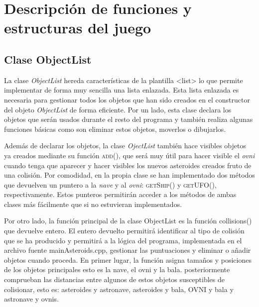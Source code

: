 \section{Descripción de funciones y estructuras del juego}
\subsection{Clase ObjectList}

La clase \emph{ObjectList} hereda características de la plantilla {\textless list\textgreater} lo que permite implementar de forma muy sencilla una lista enlazada. Esta lista enlazada es necesaria para gestionar todos los objetos que han sido creados en el constructor del objeto \emph{ObjectList} de forma eficiente. 
Por un lado, esta clase declara los objetos que serán usados durante el resto del programa y también realiza algunas funciones básicas como son eliminar estos objetos, moverlos o dibujarlos.

Además de declarar los objetos, la clase \emph{OjectList} también hace visibles objetos ya creados mediante su función \textsc{add()}, que será muy útil para hacer visible el \emph{ovni} cuando tenga que aparecer y hacer visibles los nuevos asteroides creados fruto de una colisión. 
Por comodidad, en la propia clase se han implementado dos métodos que devuelven un puntero a la \emph{nave} y al \emph{ovni}: \textsc{getShip()} y \textsc{getUFO()}, respectivamente. Estos punteros permitirán acceder a los métodos de ambas clases más fácilmente que si no estuvieran implementados.

Por otro lado, la función principal de la clase ObjectList es la función collisions() que devuelve entero. El entero devuelto permitirá identificar al tipo de colisión que se ha producido y permitirá a la lógica del programa, implementada en el archivo fuente mainAsteroids.cpp, gestionar las puntuaciones y eliminar o añadir objetos cuando proceda. En primer lugar, la función asigna tamaños y posiciones de los objetos principales esto es la nave, el ovni y la bala. posteriormente comprueban las distancias entre algunos de estos objetos susceptibles de colisionar, esto es: asteroides y astronave, asteroides y bala, OVNI y bala y astronave y ovnis.


